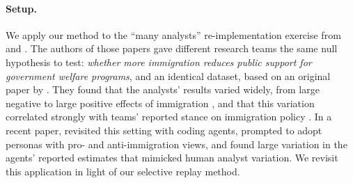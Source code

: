 \documentclass[10pt]{article}
\begin{document}
\paragraph{Setup.} We apply our method to the ``many analysts'' re-implementation exercise from \citet{breznau2022observing} and \citet{borjas2026ideological}. The authors of those papers gave different research teams the same null hypothesis to test: \textit{whether more immigration reduces public support for government welfare programs}, and an identical dataset, based on an original paper by \citet{brady2014does}. They found that the analysts' results varied widely, from large negative to large positive effects of immigration \citep{breznau2022observing}, and that this variation correlated strongly with teams' reported stance on immigration policy \citep{borjas2026ideological}. In a recent paper, \citet{miao2026agentic} revisited this setting with coding agents, prompted to adopt personas with pro- and anti-immigration views, and found large variation in the agents' reported estimates that mimicked human analyst variation. We revisit this application in light of our selective replay method.
\end{document}
